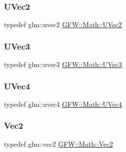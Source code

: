 \subsubsection{\texorpdfstring{U\+Vec2}{UVec2}}
{\footnotesize\ttfamily typedef glm\+::uvec2 \hyperlink{namespace_g_f_w_1_1_math_a804f4544e7f9f1d56cf67b5669922699}{G\+F\+W\+::\+Math\+::\+U\+Vec2}}

\mbox{\label{namespace_g_f_w_1_1_math_a40d5d182d7672b00d21719f80bf917fa}} 
\subsubsection{\texorpdfstring{U\+Vec3}{UVec3}}
{\footnotesize\ttfamily typedef glm\+::uvec3 \hyperlink{namespace_g_f_w_1_1_math_a40d5d182d7672b00d21719f80bf917fa}{G\+F\+W\+::\+Math\+::\+U\+Vec3}}

\mbox{\label{namespace_g_f_w_1_1_math_a030ce1aafa261033255bc45d378322ea}} 
\subsubsection{\texorpdfstring{U\+Vec4}{UVec4}}
{\footnotesize\ttfamily typedef glm\+::uvec4 \hyperlink{namespace_g_f_w_1_1_math_a030ce1aafa261033255bc45d378322ea}{G\+F\+W\+::\+Math\+::\+U\+Vec4}}

\mbox{\label{namespace_g_f_w_1_1_math_af5ba989006b289f1e575dd7a911c1521}} 
\subsubsection{\texorpdfstring{Vec2}{Vec2}}
{\footnotesize\ttfamily typedef glm\+::vec2 \hyperlink{namespace_g_f_w_1_1_math_af5ba989006b289f1e575dd7a911c1521}{G\+F\+W\+::\+Math\+::\+Vec2}}

\mbox{\label{namespace_g_f_w_1_1_math_a3c3a254de27c8bbb8434611ce231c378}} 
